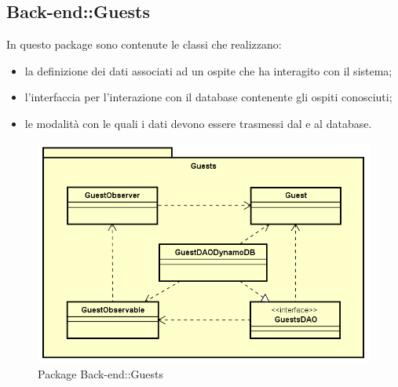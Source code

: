 \subsection{Back-end::Guests}
In questo package sono contenute le classi che realizzano: \begin{itemize} \item la definizione dei dati associati ad un ospite che ha interagito con il sistema; \item l'interfaccia per l'interazione con il database contenente gli ospiti conosciuti; \item le modalità con le quali i dati devono essere trasmessi dal e al database. \end{itemize}	
\begin{figure}[h] \centering \includegraphics[width=\textwidth,height=\textheight,keepaspectratio]{images/diagrams/back-end/Official_Backend_0304/Guest.png}
	\caption{Package Back-end::Guests}
\end{figure}
\newpage

